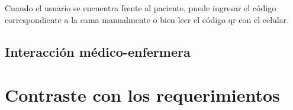 Cuando el usuario se encuentra frente al paciente, puede ingresar el código correspondiente a la cama manualmente o bien leer el código qr con el celular.

\pagebreak
\subsection{Interacción médico-enfermera}

\pagebreak
\section{Contraste con los requerimientos}

